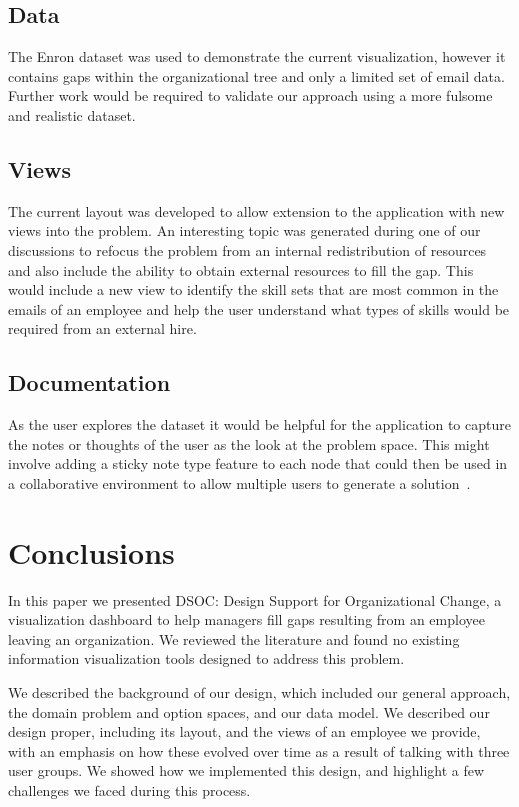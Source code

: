 \documentclass[journal]{vgtc}                %
\begin{document}
\subsection{Data}

The Enron dataset was used to demonstrate the current visualization, however it contains gaps within the organizational tree and only a limited set of email data.  Further work would be required to validate our approach using a more fulsome and realistic dataset.

\subsection{Views}

The current layout was developed to allow extension to the application with new views into the problem.  An interesting topic was generated during one of our discussions to refocus the problem from an internal redistribution of resources and also include the ability to obtain external resources to fill the gap.  This would include a new view to identify the skill sets that are most common in the emails of an employee and help the user understand what types of skills would be required from an external hire.

\subsection{Documentation}

As the user explores the dataset it would be helpful for the application to capture the notes or thoughts of the user as the look at the problem space.  This might involve adding a sticky note type feature to each node that could then be used in a collaborative environment to allow multiple users to generate a solution~\cite{ware2012information}.

\section{Conclusions}
\label{sec:conclusions}

In this paper we presented DSOC: Design Support for Organizational Change, a visualization dashboard to help managers fill gaps resulting from an employee leaving an organization. We reviewed the literature and found no existing information visualization tools designed to address this problem.

We described the background of our design, which included our general approach, the domain problem and option spaces, and our data model. We described our design proper, including its layout, and the views of an employee we provide, with an emphasis on how these evolved over time as a result of talking with three user groups. We showed how we implemented this design, and highlight a few challenges we faced during this process.
\end{document}
